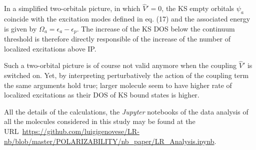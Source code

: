\documentclass[11pt,a4paper]{article}
\newcommand{\op}[1]{\hat {#1}}
\begin{document}
In a simplified two-orbitals picture, in which $\op V'=0$, the KS empty orbitals $\psi_a$ coincide with the excitation modes defined in eq. (17) and the associated energy is given by $\Omega_a=\epsilon_a-\epsilon_p$.
The increase of the KS DOS below the continuum threshold is therefore directly responsible of the increase of the number of localized excitations above IP.

 Such a two-orbital picture is of course not valid anymore when the coupling $\op V'$ is switched on. Yet, by interpreting perturbatively the action of the coupling term the same arguments hold true; larger molecule seem to have higher rate of  localized excitations as their DOS of KS bound states is higher.

 All the details of the calculations, the \textsl{Jupyter} notebooks of the data analysis of all the molecules considered in this study may be found at the URL~\url{https://github.com/luigigenovese/LR-nb/blob/master/POLARIZABILITY/nb_paper/LR_Analysis.ipynb}.
\end{document}
